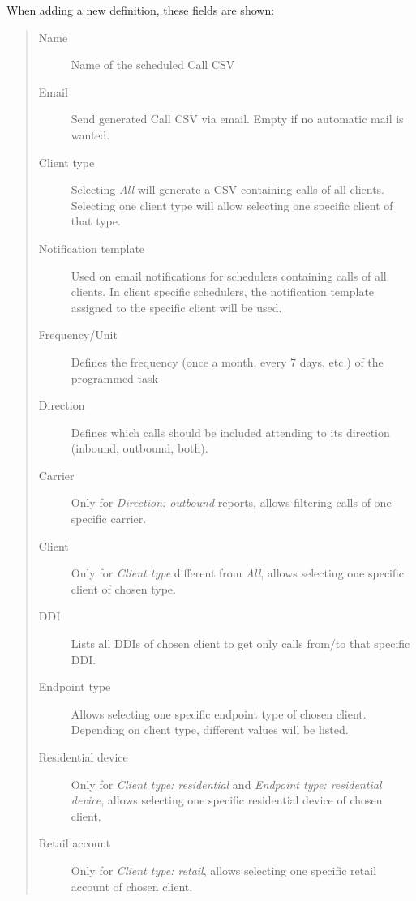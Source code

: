 \documentclass[letterpaper,10pt,spanish]{sphinxmanual}
\begin{document}
When adding a new definition, these fields are shown:
\begin{quote}
\begin{description}
\item[{Name}] \leavevmode
Name of the scheduled Call CSV

\item[{Email}] \leavevmode
Send generated Call CSV via email. Empty if no automatic mail is wanted.

\item[{Client type}] \leavevmode
Selecting \emph{All} will generate a CSV containing calls of all clients. Selecting one client type
will allow selecting one specific client of that type.

\item[{Notification template}] \leavevmode
Used on email notifications for schedulers containing calls of all clients. In client specific
schedulers, the notification template assigned to the specific client will be used.

\item[{Frequency/Unit}] \leavevmode
Defines the frequency (once a month, every 7 days, etc.) of the programmed task

\item[{Direction}] \leavevmode
Defines which calls should be included attending to its direction (inbound, outbound, both).

\item[{Carrier}] \leavevmode
Only for \emph{Direction: outbound} reports, allows filtering calls of one specific carrier.

\item[{Client}] \leavevmode
Only for \emph{Client type} different from \emph{All}, allows selecting one specific client of chosen type.

\item[{DDI}] \leavevmode
Lists all DDIs of chosen client to get only calls from/to that specific DDI.

\item[{Endpoint type}] \leavevmode
Allows selecting one specific endpoint type of chosen client. Depending on client type, different values will
be listed.

\item[{Residential device}] \leavevmode
Only for \emph{Client type: residential} and \emph{Endpoint type: residential device}, allows selecting one specific residential device of chosen client.

\item[{Retail account}] \leavevmode
Only for \emph{Client type: retail}, allows selecting one specific retail account of chosen client.


\end{description}
\end{quote}
\end{document}

